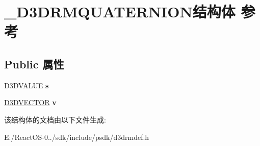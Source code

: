 \hypertarget{struct___d3_d_r_m_q_u_a_t_e_r_n_i_o_n}{}\section{\+\_\+\+D3\+D\+R\+M\+Q\+U\+A\+T\+E\+R\+N\+I\+O\+N结构体 参考}
\label{struct___d3_d_r_m_q_u_a_t_e_r_n_i_o_n}
\subsection*{Public 属性}
\begin{DoxyCompactItemize}
\item 
\mbox{\label{struct___d3_d_r_m_q_u_a_t_e_r_n_i_o_n_a3de3f1e092322e1b219170b8917bdec4}} 
D3\+D\+V\+A\+L\+UE {\bfseries s}
\item 
\mbox{\label{struct___d3_d_r_m_q_u_a_t_e_r_n_i_o_n_a504a393e2761c0b823de177ab1932a3d}} 
\hyperlink{struct___d3_d_v_e_c_t_o_r}{D3\+D\+V\+E\+C\+T\+OR} {\bfseries v}
\end{DoxyCompactItemize}


该结构体的文档由以下文件生成\+:\begin{DoxyCompactItemize}
\item 
E\+:/\+React\+O\+S-\/0../sdk/include/psdk/d3drmdef.\+h\end{DoxyCompactItemize}
